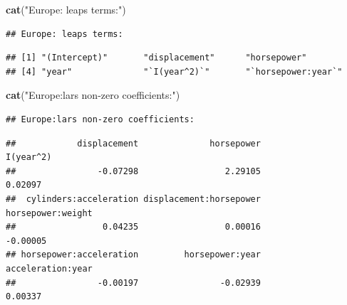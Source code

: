 \documentclass[
]{article}
\newenvironment{Shaded}{\begin{snugshade}}{\end{snugshade}}
\newcommand{\DecValTok}[1]{\textcolor[rgb]{0.00,0.00,0.81}{#1}}
\newcommand{\FunctionTok}[1]{\textcolor[rgb]{0.13,0.29,0.53}{\textbf{#1}}}
\newcommand{\NormalTok}[1]{#1}
\newcommand{\SpecialCharTok}[1]{\textcolor[rgb]{0.81,0.36,0.00}{\textbf{#1}}}
\newcommand{\StringTok}[1]{\textcolor[rgb]{0.31,0.60,0.02}{#1}}
\begin{document}
\begin{Shaded}
\begin{Highlighting}[]
\FunctionTok{cat}\NormalTok{(}\StringTok{"Europe: leaps terms:"}\NormalTok{)}
\end{Highlighting}
\end{Shaded}

\begin{verbatim}
## Europe: leaps terms:
\end{verbatim}

\begin{Shaded}
\end{Shaded}

\begin{verbatim}
## [1] "(Intercept)"       "displacement"      "horsepower"       
## [4] "year"              "`I(year^2)`"       "`horsepower:year`"
\end{verbatim}

\begin{Shaded}
\begin{Highlighting}[]
\FunctionTok{cat}\NormalTok{(}\StringTok{"Europe:lars non{-}zero coefficients:"}\NormalTok{)}
\end{Highlighting}
\end{Shaded}

\begin{verbatim}
## Europe:lars non-zero coefficients:
\end{verbatim}

\begin{Shaded}
\end{Shaded}

\begin{verbatim}
##            displacement              horsepower               I(year^2) 
##                -0.07298                 2.29105                 0.02097 
##  cylinders:acceleration displacement:horsepower       horsepower:weight 
##                 0.04235                 0.00016                -0.00005 
## horsepower:acceleration         horsepower:year       acceleration:year 
##                -0.00197                -0.02939                 0.00337
\end{verbatim}
\end{document}
